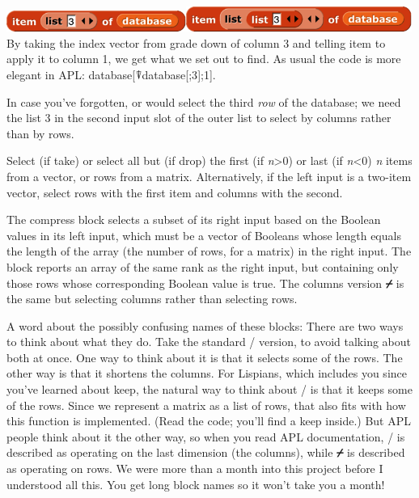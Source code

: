 \includegraphics[width=2.30833in,height=0.275in]{media/image1309.png}\includegraphics[width=2.91667in,height=0.325in]{media/image1310.png}By
taking the index vector from grade down of column 3 and telling item to
apply it to column 1, we get what we set out to find. As usual the code
is more elegant in APL: database{[}⍒database{[};3{]};1{]}.

In case you've forgotten, or would select the third \emph{row} of the
database; we need the list 3 in the second input slot of the outer list
to select by columns rather than by rows.

Select (if take) or select all but (if drop) the first (if
\emph{n}\textgreater0) or last (if \emph{n}\textless0)
\textbar{}\emph{n}\textbar{} items from a vector, or rows from a matrix.
Alternatively, if the left input is a two-item vector, select rows with
the first item and columns with the second.

The compress block selects a subset of its right input based on the
Boolean values in its left input, which must be a vector of Booleans
whose length equals the length of the array (the number of rows, for a
matrix) in the right input. The block reports an array of the same rank
as the right input, but containing only those rows whose corresponding
Boolean value is true. The columns version \textbf{⌿} is the same but
selecting columns rather than selecting rows.

A word about the possibly confusing names of these blocks: There are two
ways to think about what they do. Take the standard / version, to avoid
talking about both at once. One way to think about it is that it selects
some of the rows. The other way is that it shortens the columns. For
Lispians, which includes you since you've learned about keep, the
natural way to think about / is that it keeps some of the rows. Since we
represent a matrix as a list of rows, that also fits with how this
function is implemented. (Read the code; you'll find a keep inside.) But
APL people think about it the other way, so when you read APL
documentation, / is described as operating on the last dimension (the
columns), while \textbf{⌿} is described as operating on rows. We were
more than a month into this project before I understood all this. You
get long block names so it won't take you a month!


